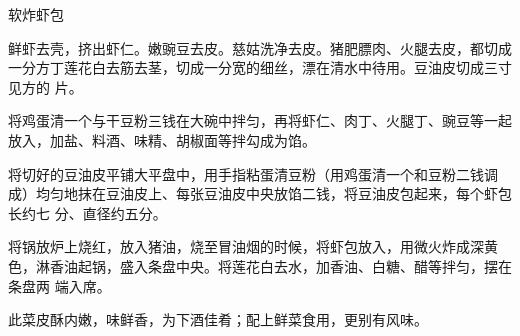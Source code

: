 %
%
%
%
%
%
%
\begin{recipe}{软炸虾包}

\ingredients


\preparation

\step 鲜虾去壳，挤出虾仁。嫩豌豆去皮。慈姑洗净去皮。猪肥膘肉、火腿去皮，都切成
一分方丁莲花白去筋去茎，切成一分宽的细丝，漂在清水中待用。豆油皮切成三寸见方的
片。

\step 将鸡蛋清一个与干豆粉三钱在大碗中拌匀，再将虾仁、肉丁、火腿丁、豌豆等一起
放入，加盐、料酒、味精、胡椒面等拌勾成为馅。

\step 将切好的豆油皮平铺大平盘中，用手指粘蛋清豆粉（用鸡蛋清一个和豆粉二钱调
成）均匀地抹在豆油皮上、每张豆油皮中央放馅二钱，将豆油皮包起来，每个虾包长约七
分、直径约五分。

\step 将锅放炉上烧红，放入猪油，烧至冒油烟的时候，将虾包放入，用微火炸成深黄
色，淋香油起锅，盛入条盘中央。将莲花白去水，加香油、白糖、醋等拌匀，摆在条盘两
端入席。

\features

此菜皮酥内嫩，味鲜香，为下酒佳肴；配上鲜菜食用，更别有风味。

\end{recipe}

